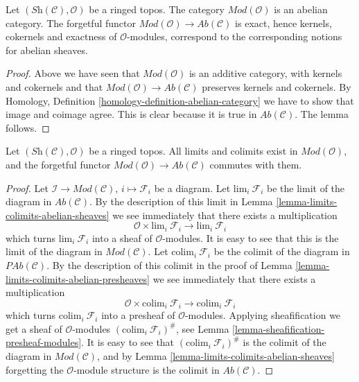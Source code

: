 \begin{lemma}
\label{lemma-abelian}
Let $(\textit{Sh}(\mathcal{C}), \mathcal{O})$ be a ringed topos.
The category $\textit{Mod}(\mathcal{O})$ is an abelian category.
The forgetful functor
$\textit{Mod}(\mathcal{O}) \to \textit{Ab}(\mathcal{C})$
is exact, hence kernels, cokernels and exactness of
$\mathcal{O}$-modules, correspond to the corresponding notions
for abelian sheaves.
\end{lemma}

\begin{proof}
Above we have seen that $\textit{Mod}(\mathcal{O})$ is an additive
category, with kernels and cokernels
and that $\textit{Mod}(\mathcal{O}) \to \textit{Ab}(\mathcal{C})$
preserves kernels and cokernels.
By Homology, Definition \ref{homology-definition-abelian-category}
we have to show that image and coimage agree. This is clear
because it is true in $\textit{Ab}(\mathcal{C})$. The lemma follows.
\end{proof}

\begin{lemma}
\label{lemma-limits-colimits}
Let $(\textit{Sh}(\mathcal{C}), \mathcal{O})$ be a ringed topos.
All limits and colimits exist in $\textit{Mod}(\mathcal{O})$, and
the forgetful functor
$\textit{Mod}(\mathcal{O}) \to \textit{Ab}(\mathcal{C})$
commutes with them.
\end{lemma}

\begin{proof}
Let $\mathcal{I} \to \textit{Mod}(\mathcal{C})$, $i \mapsto \mathcal{F}_i$
be a diagram. Let $\text{lim}_i\ \mathcal{F}_i$ be the limit of the diagram
in $\textit{Ab}(\mathcal{C})$. By the description of this limit in
Lemma \ref{lemma-limits-colimits-abelian-sheaves} we see immediately that
there exists a multiplication
$$
\mathcal{O} \times \text{lim}_i\ \mathcal{F}_i
\longrightarrow
\text{lim}_i\ \mathcal{F}_i
$$
which turns $\text{lim}_i\ \mathcal{F}_i$ into a sheaf of
$\mathcal{O}$-modules. It is easy to see that this is the
limit of the diagram in $\textit{Mod}(\mathcal{C})$. Let
$\text{colim}_i\ \mathcal{F}_i$ be the colimit of the diagram
in $\textit{PAb}(\mathcal{C})$. By the description of this colimit
in the proof of Lemma \ref{lemma-limits-colimits-abelian-presheaves}
we see immediately that there exists a multiplication
$$
\mathcal{O} \times \text{colim}_i\ \mathcal{F}_i
\longrightarrow
\text{colim}_i\ \mathcal{F}_i
$$
which turns $\text{colim}_i\ \mathcal{F}_i$ into a presheaf of
$\mathcal{O}$-modules. Applying sheafification we get a
sheaf of $\mathcal{O}$-modules $(\text{colim}_i\ \mathcal{F}_i)^\#$,
see Lemma \ref{lemma-sheafification-presheaf-modules}.
It is easy to see that $(\text{colim}_i\ \mathcal{F}_i)^\#$
is the colimit of the diagram in $\textit{Mod}(\mathcal{C})$, and
by Lemma \ref{lemma-limits-colimits-abelian-sheaves}
forgetting the $\mathcal{O}$-module structure is
the colimit in $\textit{Ab}(\mathcal{C})$.
\end{proof}


